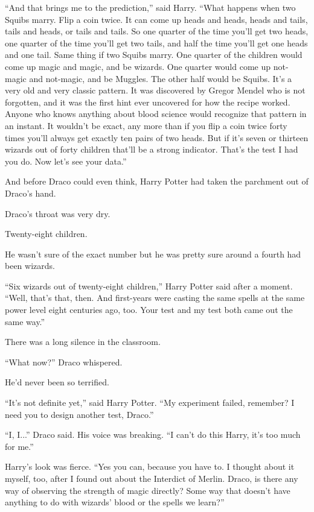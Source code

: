 ``And that brings me to the prediction,'' said Harry. ``What happens
when two Squibs marry. Flip a coin twice. It can come up heads and
heads, heads and tails, tails and heads, or tails and tails. So one
quarter of the time you'll get two heads, one quarter of the time you'll
get two tails, and half the time you'll get one heads and one tail. Same
thing if two Squibs marry. One quarter of the children would come up
magic and magic, and be wizards. One quarter would come up not-magic and
not-magic, and be Muggles. The other half would be Squibs. It's a very
old and very classic pattern. It was discovered by Gregor Mendel who is
not forgotten, and it was the first hint ever uncovered for how the
recipe worked. Anyone who knows anything about blood science would
recognize that pattern in an instant. It wouldn't be exact, any more
than if you flip a coin twice forty times you'll always get exactly ten
pairs of two heads. But if it's seven or thirteen wizards out of forty
children that'll be a strong indicator. That's the test I had you do.
Now let's see your data.''

And before Draco could even think, Harry Potter had taken the parchment
out of Draco's hand.

Draco's throat was very dry.

Twenty-eight children.

He wasn't sure of the exact number but he was pretty sure around a
fourth had been wizards.

``Six wizards out of twenty-eight children,'' Harry Potter said after a
moment. ``Well, that's that, then. And first-years were casting the same
spells at the same power level eight centuries ago, too. Your test and
my test both came out the same way.''

There was a long silence in the classroom.

``What now?'' Draco whispered.

He'd never been so terrified.

``It's not definite yet,'' said Harry Potter. ``My experiment failed,
remember? I need you to design another test, Draco.''

``I, I...'' Draco said. His voice was breaking. ``I can't do this
Harry, it's too much for me.''

Harry's look was fierce. ``Yes you can, because you have to. I thought
about it myself, too, after I found out about the Interdict of Merlin.
Draco, is there any way of observing the strength of magic directly?
Some way that doesn't have anything to do with wizards' blood or the
spells we learn?''

